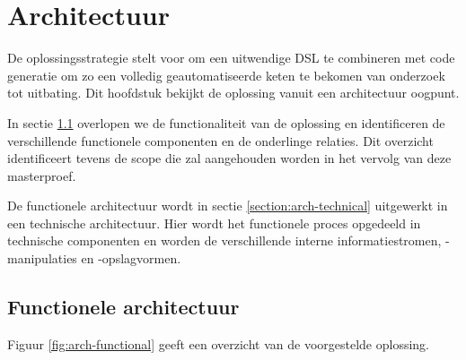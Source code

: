 
\chapter{Architectuur}
\label{chapter:architectuur}

De oplossingsstrategie stelt voor om een uitwendige DSL te combineren met code
generatie om zo een volledig geautomatiseerde keten te bekomen van onderzoek
tot uitbating. Dit hoofdstuk bekijkt de oplossing vanuit een architectuur
oogpunt.

In sectie \ref{section:arch-functional} overlopen we de functionaliteit van de
oplossing en identificeren de verschillende functionele componenten en de
onderlinge relaties. Dit overzicht identificeert tevens de scope die zal
aangehouden worden in het vervolg van deze masterproef.

De functionele architectuur wordt in sectie \ref{section:arch-technical}
uitgewerkt in een technische architectuur. Hier wordt het functionele proces
opgedeeld in technische componenten en worden de verschillende interne
informatiestromen, -manipulaties en -opslagvormen.

\section{Functionele architectuur}
\label{section:arch-functional}

Figuur \ref{fig:arch-functional} geeft een overzicht van de voorgestelde
oplossing.

